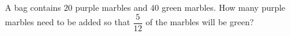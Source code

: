 A bag contains $20$ purple marbles and $40$ green marbles. How many purple marbles need to be added so that $\dfrac{5}{12}$ of the marbles will be green?
